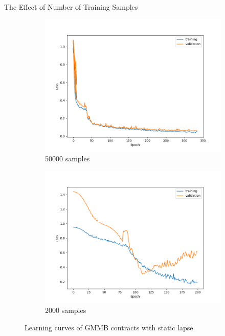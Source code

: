 \documentclass[9pt,handout]{beamer}
\begin{document}
\begin{frame}{The Effect of Number of Training Samples}
    \begin{figure}[ht]
        \centering
        \begin{subfigure}{0.48\textwidth}
            \includegraphics[width=\textwidth]{../project3/figures/figure1a.png}
            \caption{50000 samples}
        \end{subfigure}
        \begin{subfigure}{0.48\textwidth}
            \includegraphics[width=\textwidth]{../project3/figures/figure1b.png}
            \caption{2000 samples}
        \end{subfigure}
        \caption{Learning curves of GMMB contracts with static lapse}
    \end{figure}


\end{frame}
    
\end{document}

